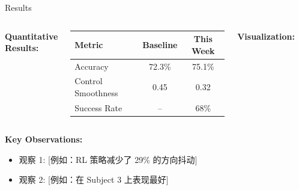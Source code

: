 \documentclass[aspectratio=169, 11pt]{beamer}
\begin{document}
\begin{frame}{Results}
    \begin{columns}[T]
        \textbf{Quantitative Results:}
        
        \vspace{2mm}
        \begin{table}
            \centering
            \small
            \begin{tabular}{lcc}
                \toprule
                Metric & Baseline & This Week \\
                \midrule
                Accuracy & 72.3\% & 75.1\% \\
                Control Smoothness & 0.45 & 0.32 \\
                Success Rate & -- & 68\% \\
                \bottomrule
            \end{tabular}
        \end{table}
        
        \textbf{Visualization:}
        
        
        \begin{center}
        \end{center}
    \end{columns}
    
    \vspace{3mm}
    \textbf{Key Observations:}
    \begin{itemize}
        \item 观察 1: [例如：RL 策略减少了 29\% 的方向抖动]
        \item 观察 2: [例如：在 Subject 3 上表现最好]
    \end{itemize}
\end{frame}
\end{document}
